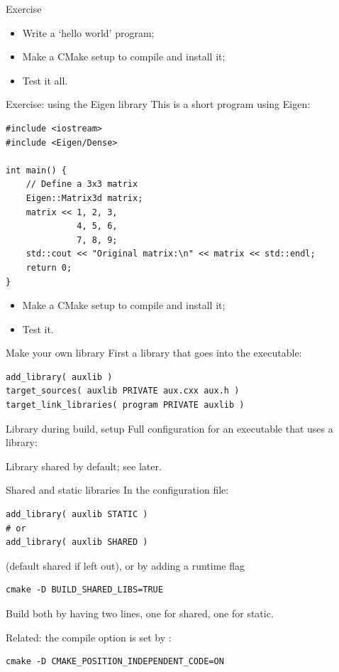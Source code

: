 \begin{numberedframe}{Exercise}
  \begin{itemize}
  \item Write a `hello world' program;
  \item Make a CMake setup to compile and install it;
  \item Test it all.
  \end{itemize}
\end{numberedframe}

\begin{numberedframe}{Exercise: using the Eigen library}
This is a short program using Eigen:
\begin{lstlisting}
#include <iostream>
#include <Eigen/Dense>

int main() {
    // Define a 3x3 matrix
    Eigen::Matrix3d matrix;
    matrix << 1, 2, 3,
              4, 5, 6,
              7, 8, 9;
    std::cout << "Original matrix:\n" << matrix << std::endl;
    return 0;
}
\end{lstlisting}
  \begin{itemize}
  \item Make a CMake setup to compile and install it;
  \item Test it.
  \end{itemize}
\end{numberedframe}

\begin{numberedframe}{Make your own library}
First a library that goes into the executable:
\begin{lstlisting}
add_library( auxlib )
target_sources( auxlib PRIVATE aux.cxx aux.h )
target_link_libraries( program PRIVATE auxlib )
\end{lstlisting}
\end{numberedframe}

\begin{numberedframe}{Library during build, setup}
  Full configuration for an executable that uses a library:
  \lstset{numbers=left,numberstyle=\tiny}
    
  Library shared by default; see later.
\end{numberedframe}

\begin{numberedframe}{Shared and static libraries}
  In the configuration file:
\begin{lstlisting}
add_library( auxlib STATIC )
# or
add_library( auxlib SHARED )
\end{lstlisting}
(default shared if left out),
  or by adding a runtime flag
\begin{lstlisting}
cmake -D BUILD_SHARED_LIBS=TRUE
\end{lstlisting}
Build both by having two lines, one for shared,  one for static.

Related: the  compile option
is set by :
\begin{lstlisting}
cmake -D CMAKE_POSITION_INDEPENDENT_CODE=ON
\end{lstlisting}
\end{numberedframe}

